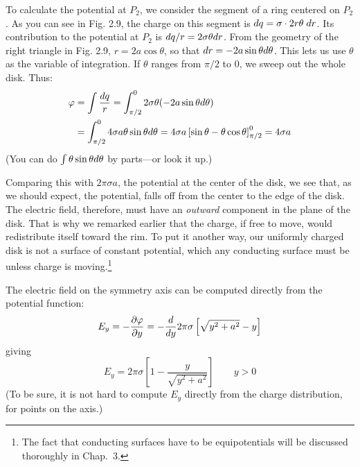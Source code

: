 To calculate the potential at $P_2$, we consider the segment of a ring
centered on $P_2$. As you can see in Fig. 2.9, the charge on this segment
is $d q = \sigma\cdot 2r\theta\;d r$. Its contribution to the potential at $P_2$ is
$dq/r = 2\sigma\theta d r$. From the geometry of the right triangle in Fig. 2.9,
$r = 2a \cos \theta$, so that $d r = -2a \sin \theta d\theta$. This lets us use $\theta$ as the
variable of integration. If $\theta$ ranges from $\pi/2$ to 0, we sweep out the
whole disk. Thus:
\begin{align}
  \varphi &= \int \frac{d q}{r} = \int_{\pi/2}^0 2\sigma\theta(-2a\sin\theta d\theta) \\
       &= \int_{\pi/2}^0 4\sigma a \theta \sin\theta d\theta
        = 4\sigma a\left[\sin\theta-\theta\cos\theta\right]_{\pi/2}^0 = 4\sigma a
\end{align}
(You can do $\int \theta \sin \theta d\theta$ by parts---or look it up.)

Comparing this with $2\pi\sigma a$, the potential at the center of the disk,
we see that, as we should expect, the potential, falls off from the center
to the edge of the disk. The electric field, therefore, must have an
\emph{outward} component in the plane of the disk. That is why we remarked
earlier that the charge, if free to move, would redistribute
itself toward the rim. To put it another way, our uniformly charged
disk is not a surface of constant potential, which any conducting
surface must be unless charge is moving.\footnote{The fact that conducting
surfaces have to be equipotentials will be discussed
thoroughly in Chap.~3.}

The electric field on the symmetry axis can be computed directly
from the potential function:
\begin{equation}
  E_y = -\frac{\partial\varphi}{\partial y}
      = -\frac{d}{d y} 2\pi\sigma\left[\sqrt{y^2+a^2}-y\right]
\end{equation}
giving
\begin{equation}
  E_y =  2\pi\sigma\left[1-\frac{y}{\sqrt{y^2+a^2}}\right] \qquad y>0
\end{equation}
(To be sure, it is not hard to compute $E_y$ directly from the charge 
distribution, for points on the axis.)

